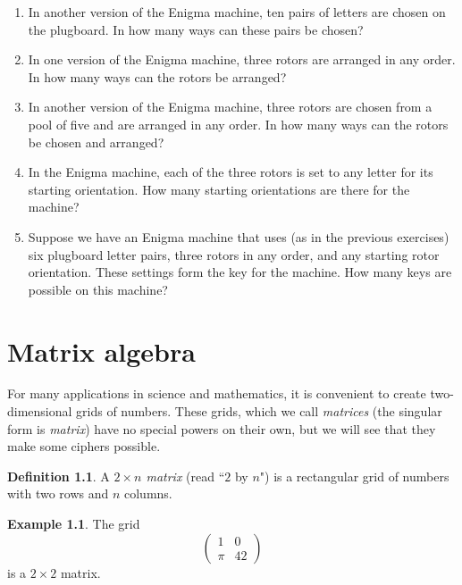 \documentclass{book}
\theoremstyle{plain}
\theoremstyle{definition}
\newtheorem{definition}[theorem]{Definition}
\newtheorem{example}[theorem]{Example}
\newif\ifprintsolutions
\newcommand{\solution}[1]{\ifprintsolutions \begin{sloppypar}{\it #1}\end{sloppypar} \fi} %
\begin{document}
\begin{enumerate}
\item In another version of the Enigma machine, ten pairs of letters are chosen on the plugboard. In how many ways can these pairs be chosen? \solution{The pairs can be chosen in $\binom{26}{2}\binom{24}{2}\cdots\binom{8}{2}/10! = 150738274937250$ ways.}
\item In one version of the Enigma machine, three rotors are arranged in any order. In how many ways can the rotors be arranged? \solution{They can be arranged in $3! = 6$ ways.}
\item In another version of the Enigma machine, three rotors are chosen from a pool of five and are arranged in any order. In how many ways can the rotors be chosen and arranged? \solution{They can be arranged in $\binom{5}{3}3! = 60$ ways.}
\item In the Enigma machine, each of the three rotors is set to any letter for its starting orientation. How many starting orientations are there for the machine? \solution{There are $26^3 = 17576$ settings.}
\item Suppose we have an Enigma machine that uses (as in the previous exercises) six plugboard letter pairs, three rotors in any order, and any starting rotor orientation. These settings form the key for the machine. How many keys are possible on this machine? \solution{The number of keys is the product of the previous applicable solutions, for a total of $10586916764424000$.}
\end{enumerate}

\chapter{Matrix algebra}
For many applications in science and mathematics, it is convenient to create two-dimensional grids of numbers. These grids, which we call {\it matrices} (the singular form is {\it matrix}) have no special powers on their own, but we will see that they make some ciphers possible.

\begin{definition}
A {\it $2 \times n$ matrix} (read ``$2$ by $n$") is a rectangular grid of numbers with two rows and $n$ columns.
\end{definition}

\begin{example}
The grid $$\begin{pmatrix} 1 & 0 \\ \pi & 42 \end{pmatrix}$$ is a $2 \times 2$ matrix.
\end{example}
\end{document}
